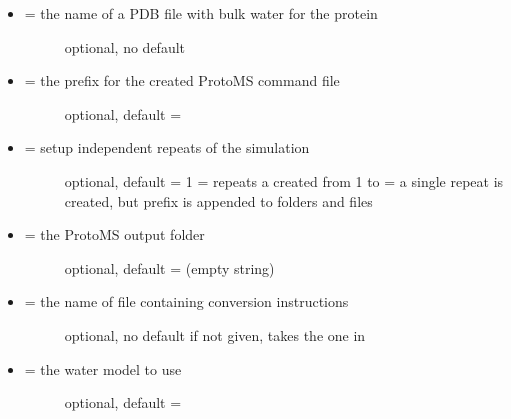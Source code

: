 \documentclass[letterpaper,10pt,english]{manual}
\begin{document}
\begin{itemize}
\item {} \begin{description}
\item[{ = the name of a PDB file with bulk water for the protein}] \leavevmode
optional, no default

\end{description}

\item {} \begin{description}
\item[{ = the prefix for the created ProtoMS command file}] \leavevmode
optional, default = 

\end{description}

\item {} \begin{description}
\item[{ = setup independent repeats of the simulation}] \leavevmode
optional, default = 1
 = repeats a created from 1 to 
 = a single repeat is created, but prefix is appended to folders and files

\end{description}

\item {} \begin{description}
\item[{ = the ProtoMS output folder}] \leavevmode
optional, default =  (empty string)

\end{description}

\item {} \begin{description}
\item[{ = the name of file containing conversion instructions}] \leavevmode
optional, no default
if not given, takes the one in 

\end{description}

\item {} \begin{description}
\item[{ = the water model to use}] \leavevmode
optional, default = 

\end{description}


\end{itemize}
\end{document}
